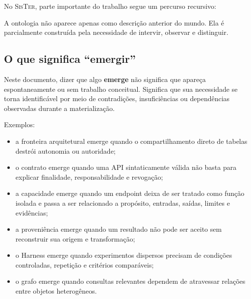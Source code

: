 \documentclass[11pt,a4paper,oneside]{article}
\newcommand{\termo}[1]{\textbf{#1}}
\newcommand{\sister}{\textsc{SisTer}}
\begin{document}
No \sister{}, parte importante do trabalho segue um percurso recursivo:

\begin{center}
\end{center}

A ontologia não aparece apenas como descrição anterior do mundo. Ela é parcialmente construída pela necessidade de intervir, observar e distinguir.

\subsection{O que significa ``emergir''}

Neste documento, dizer que algo \termo{emerge} não significa que apareça espontaneamente ou sem trabalho conceitual. Significa que sua necessidade se torna identificável por meio de contradições, insuficiências ou dependências observadas durante a materialização.

Exemplos:

\begin{itemize}
  \item a fronteira arquitetural emerge quando o compartilhamento direto de tabelas destrói autonomia ou autoridade;
  \item o contrato emerge quando uma API sintaticamente válida não basta para explicar finalidade, responsabilidade e revogação;
  \item a capacidade emerge quando um endpoint deixa de ser tratado como função isolada e passa a ser relacionado a propósito, entradas, saídas, limites e evidências;
  \item a proveniência emerge quando um resultado não pode ser aceito sem reconstruir sua origem e transformação;
  \item o Harness emerge quando experimentos dispersos precisam de condições controladas, repetição e critérios comparáveis;
  \item o grafo emerge quando consultas relevantes dependem de atravessar relações entre objetos heterogêneos.
\end{itemize}
\end{document}
